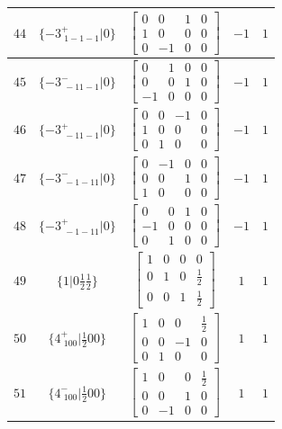 \documentclass[fleqn,8pt]{jsarticle}
\begin{document}
\begin{longtable}{ccccc}
$ 44 $ & $ \{-3^{+}_{\,\,1-1-1}|0\} $ & $ \begin{bmatrix} 0 & 0 & 1 & 0 \\ 1 & 0 & 0 & 0 \\ 0 & -1 & 0 & 0 \end{bmatrix} $ & $ -1 $ & $ 1 $ \\ \hline
$ 45 $ & $ \{-3^{-}_{\,\,-11-1}|0\} $ & $ \begin{bmatrix} 0 & 1 & 0 & 0 \\ 0 & 0 & 1 & 0 \\ -1 & 0 & 0 & 0 \end{bmatrix} $ & $ -1 $ & $ 1 $ \\ \hline
$ 46 $ & $ \{-3^{+}_{\,\,-11-1}|0\} $ & $ \begin{bmatrix} 0 & 0 & -1 & 0 \\ 1 & 0 & 0 & 0 \\ 0 & 1 & 0 & 0 \end{bmatrix} $ & $ -1 $ & $ 1 $ \\ \hline
$ 47 $ & $ \{-3^{-}_{\,\,-1-11}|0\} $ & $ \begin{bmatrix} 0 & -1 & 0 & 0 \\ 0 & 0 & 1 & 0 \\ 1 & 0 & 0 & 0 \end{bmatrix} $ & $ -1 $ & $ 1 $ \\ \hline
$ 48 $ & $ \{-3^{+}_{\,\,-1-11}|0\} $ & $ \begin{bmatrix} 0 & 0 & 1 & 0 \\ -1 & 0 & 0 & 0 \\ 0 & 1 & 0 & 0 \end{bmatrix} $ & $ -1 $ & $ 1 $ \\ \hline
$ 49 $ & $ \{1|0 \frac{1}{2} \frac{1}{2}\} $ & $ \begin{bmatrix} 1 & 0 & 0 & 0 \\ 0 & 1 & 0 & \frac{1}{2} \\ 0 & 0 & 1 & \frac{1}{2} \end{bmatrix} $ & $ 1 $ & $ 1 $ \\ \hline
$ 50 $ & $ \{4^{+}_{\,\,100}|\frac{1}{2} 0 0\} $ & $ \begin{bmatrix} 1 & 0 & 0 & \frac{1}{2} \\ 0 & 0 & -1 & 0 \\ 0 & 1 & 0 & 0 \end{bmatrix} $ & $ 1 $ & $ 1 $ \\ \hline
$ 51 $ & $ \{4^{-}_{\,\,100}|\frac{1}{2} 0 0\} $ & $ \begin{bmatrix} 1 & 0 & 0 & \frac{1}{2} \\ 0 & 0 & 1 & 0 \\ 0 & -1 & 0 & 0 \end{bmatrix} $ & $ 1 $ & $ 1 $ \\ \hline

\end{longtable}
\end{document}
